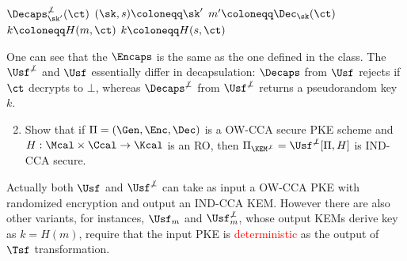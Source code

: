 \begin{problem}
\begin{simplebox}
\begin{minipage}[t]{0.32\textwidth}
\begin{algorithmic}[1]
            \end{algorithmic}
        \end{minipage}
        \hfill
        \begin{minipage}[t]{0.32\textwidth}
            \begin{algorithmic}[1]
                \Statex \textbf{$\Decaps^{\not\bot}_{\sk'}(\ct)$}
                \Indent
                    \State $(\sk, s)\coloneqq \sk'$
                    \State $m' \coloneqq \Dec_\sk(\ct)$
                        \State\Return $k\coloneqq H(m, \ct)$
                    \Else 
                        \State\Return $k\coloneqq H(s, \ct)$
                    \EndIf
                \EndIndent
            \end{algorithmic}
        \end{minipage}
    \end{simplebox}
    One can see that the $\Encaps$ is the same as the one defined in the class. The $\Usf^{\not\bot}$ and $\Usf$ essentially differ in decapsulation: $\Decaps$ from $\Usf$ rejects if $\ct$ decrypts to $\bot$, whereas $\Decaps^{\not\bot}$ from $\Usf^{\not\bot}$ returns a pseudorandom key $k$.
    \begin{enumerate}[label=(\roman*)]
        \setcounter{enumi}{1}
        \item Show that if $\Pi = (\Gen, \Enc, \Dec)$ is a OW-CCA secure PKE scheme and $H: \Mcal\times \Ccal\to \Kcal$ is an RO, then $\Pi_{\KEM^{\not\bot}} = \Usf^{\not\bot}[\Pi, H]$ is IND-CCA secure.
    \end{enumerate}
    \begin{remark}
        Actually both $\Usf$ and $\Usf^{\not\bot}$ can take as input a OW-CCA PKE with randomized encryption and output an IND-CCA KEM. However there are also other variants, for instances, $\Usf_m$ and $\Usf^{\not\bot}_m$, whose output KEMs derive key as $k = H(m)$, require that the input PKE is \textcolor{red}{deterministic} as the output of $\Tsf$ transformation.
    \end{remark}
\end{problem}



